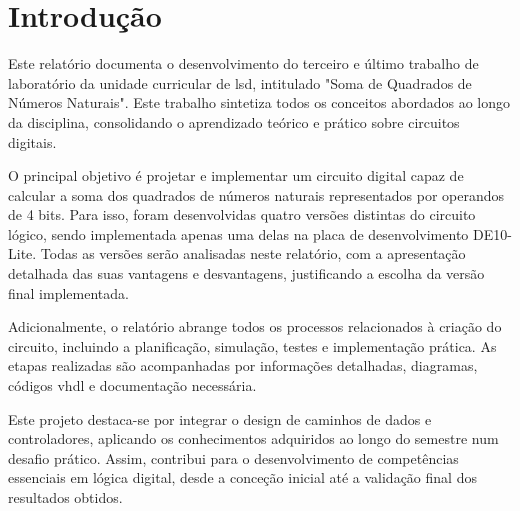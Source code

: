 \pagestyle{geral}
\section{Introdução}
\justifying

Este relatório documenta o desenvolvimento do terceiro e último trabalho de laboratório da unidade curricular de \gls{lsd}, intitulado "Soma de Quadrados de Números Naturais". Este trabalho sintetiza todos os conceitos abordados ao longo da disciplina, consolidando o aprendizado teórico e prático sobre circuitos digitais.

O principal objetivo é projetar e implementar um circuito digital capaz de calcular a soma dos quadrados de números naturais representados por operandos de 4 bits. Para isso, foram desenvolvidas quatro versões distintas do circuito lógico, sendo implementada apenas uma delas na placa de desenvolvimento DE10-Lite. Todas as versões serão analisadas neste relatório, com a apresentação detalhada das suas vantagens e desvantagens, justificando a escolha da versão final implementada.

Adicionalmente, o relatório abrange todos os processos relacionados à criação do circuito, incluindo a planificação, simulação, testes e implementação prática. As etapas realizadas são acompanhadas por informações detalhadas, diagramas, códigos \Gls{vhdl} e documentação necessária.

Este projeto destaca-se por integrar o design de caminhos de dados e controladores, aplicando os conhecimentos adquiridos ao longo do semestre num desafio prático. Assim, contribui para o desenvolvimento de competências essenciais em lógica digital, desde a conceção inicial até a validação final dos resultados obtidos.